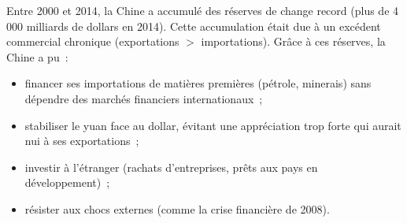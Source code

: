 \begin{example}
  Entre 2000 et 2014, la Chine a accumulé des réserves de change record (plus de
  4\,000 milliards de dollars en 2014). Cette accumulation était due à un excédent
  commercial chronique (exportations $>$ importations). Grâce à ces réserves, la Chine
  a pu~:
  \begin{itemize}
    \item financer ses importations de matières premières (pétrole, minerais) sans
      dépendre des marchés financiers internationaux~;
    \item stabiliser le yuan face au dollar, évitant une appréciation trop forte qui
      aurait nui à ses exportations~;
    \item investir à l'étranger (rachats d'entreprises, prêts aux pays en
      développement)~;
    \item résister aux chocs externes (comme la crise financière de 2008).
  \end{itemize}
\end{example}

